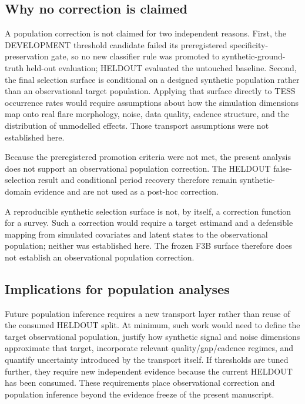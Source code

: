 \documentclass[manuscript,linenumbers]{aastex702}
\begin{document}
\subsection{Why no correction is claimed}
A population correction is not claimed for two independent reasons. First, the DEVELOPMENT threshold candidate failed its preregistered specificity-preservation gate, so no new classifier rule was promoted to synthetic-ground-truth held-out evaluation; HELDOUT evaluated the untouched baseline. Second, the final selection surface is conditional on a designed synthetic population rather than an observational target population. Applying that surface directly to TESS occurrence rates would require assumptions about how the simulation dimensions map onto real flare morphology, noise, data quality, cadence structure, and the distribution of unmodelled effects. Those transport assumptions were not established here.

Because the preregistered promotion criteria were not met, the present analysis does not support an observational population correction. The HELDOUT false-selection result and conditional period recovery therefore remain synthetic-domain evidence and are not used as a post-hoc correction.




A reproducible synthetic selection surface is not, by itself, a correction function for a survey. Such a correction would require a target estimand and a defensible mapping from simulated covariates and latent states to the observational population; neither was established here. The frozen F3B surface therefore does not establish an observational population correction.

\subsection{Implications for population analyses}
Future population inference requires a new transport layer rather than reuse of the consumed HELDOUT split. At minimum, such work would need to define the target observational population, justify how synthetic signal and noise dimensions approximate that target, incorporate relevant quality/gap/cadence regimes, and quantify uncertainty introduced by the transport itself. If thresholds are tuned further, they require new independent evidence because the current HELDOUT has been consumed. These requirements place observational correction and population inference beyond the evidence freeze of the present manuscript.
\end{document}
